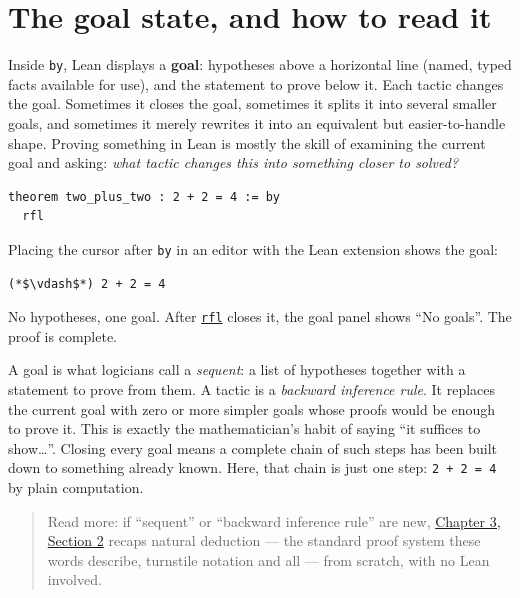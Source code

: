 \section{The goal state, and how to read it}\label{sec:04-tactics:01-goal-state:1}

Inside \texttt{by}, Lean displays a \textbf{goal}: hypotheses above a horizontal line (named, typed facts available for use), and the statement to prove below it. Each tactic changes the goal. Sometimes it closes the goal, sometimes it splits it into several smaller goals, and sometimes it merely rewrites it into an equivalent but easier-to-handle shape. Proving something in Lean is mostly the skill of examining the current goal and asking: \emph{what tactic changes this into something closer to solved?}

\begin{lstlisting}
theorem two_plus_two : 2 + 2 = 4 := by
  rfl
\end{lstlisting}

Placing the cursor after \texttt{by} in an editor with the Lean extension shows the goal:

\begin{lstlisting}
(*$\vdash$*) 2 + 2 = 4
\end{lstlisting}

No hypotheses, one goal. After \href{https://lean-lang.org/doc/reference/latest/Tactic-Proofs/Tactic-Reference/}{\texttt{rfl}} closes it, the goal panel shows ``No goals''. The proof is complete.

\begin{mathreading}

A goal is what logicians call a \emph{sequent}: a list of hypotheses together with a statement to prove from them. A tactic is a \emph{backward inference rule}. It replaces the current goal with zero or more simpler goals whose proofs would be enough to prove it. This is exactly the mathematician's habit of saying ``it suffices to show\ldots{}''. Closing every goal means a complete chain of such steps has been built down to something already known. Here, that chain is just one step: \texttt{2 + 2 = 4} by plain computation.

\end{mathreading}

\begin{quote}
Read more: if ``sequent'' or ``backward inference rule'' are new, \hyperref[sec:03-propositions-and-proofs:02-logic-recap:1]{Chapter 3, Section 2} recaps natural deduction --- the standard proof system these words describe, turnstile notation and all --- from scratch, with no Lean involved.
\end{quote}

